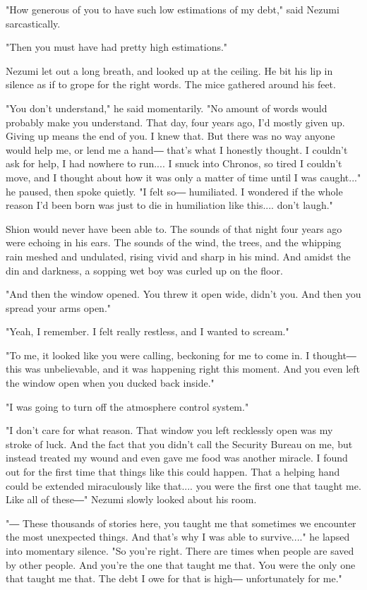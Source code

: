 "How generous of you to have such low estimations of my debt," said
Nezumi sarcastically.

"Then you must have had pretty high estimations."

Nezumi let out a long breath, and looked up at the ceiling. He bit his
lip in silence as if to grope for the right words. The mice gathered
around his feet.

"You don't understand," he said momentarily. "No amount of words would
probably make you understand. That day, four years ago, I'd mostly given
up. Giving up means the end of you. I knew that. But there was no way
anyone would help me, or lend me a hand― that's what I honestly thought.
I couldn't ask for help, I had nowhere to run.... I snuck into Chronos,
so tired I couldn't move, and I thought about how it was only a matter
of time until I was caught..." he paused, then spoke quietly. "I felt
so― humiliated. I wondered if the whole reason I'd been born was just to
die in humiliation like this.... don't laugh."

Shion would never have been able to. The sounds of that night four years
ago were echoing in his ears. The sounds of the wind, the trees, and the
whipping rain meshed and undulated, rising vivid and sharp in his mind.
And amidst the din and darkness, a sopping wet boy was curled up on the
floor.

"And then the window opened. You threw it open wide, didn't you. And
then you spread your arms open."

"Yeah, I remember. I felt really restless, and I wanted to scream."

"To me, it looked like you were calling, beckoning for me to come in. I
thought― this was unbelievable, and it was happening right this moment.
And you even left the window open when you ducked back inside."

"I was going to turn off the atmosphere control system."

"I don't care for what reason. That window you left recklessly open was
my stroke of luck. And the fact that you didn't call the Security Bureau
on me, but instead treated my wound and even gave me food was another
miracle. I found out for the first time that things like this could
happen. That a helping hand could be extended miraculously like that....
you were the first one that taught me. Like all of these―" Nezumi slowly
looked about his room.

"― These thousands of stories here, you taught me that sometimes we
encounter the most unexpected things. And that's why I was able to
survive...." he lapsed into momentary silence. "So you're right. There
are times when people are saved by other people. And you're the one that
taught me that. You were the only one that taught me that. The debt I
owe for that is high― unfortunately for me."

